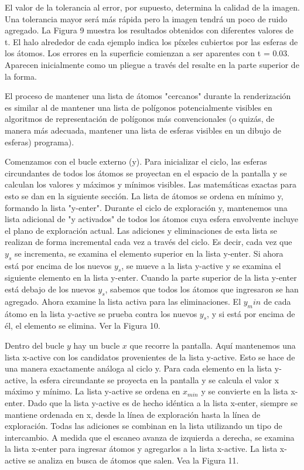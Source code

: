 El valor de la tolerancia al error, por supuesto, determina la calidad de la imagen. Una tolerancia mayor será más rápida pero la imagen tendrá un poco de ruido agregado. La Figura 9 muestra los resultados obtenidos con diferentes valores de t. El halo alrededor de cada ejemplo indica los píxeles cubiertos por las esferas de los átomos. Los errores en la superficie comienzan a ser aparentes con t = 0.03. Aparecen inicialmente como un pliegue a través del resalte en la parte superior de la forma.

El proceso de mantener una lista de átomos "cercanos" durante la renderización es similar al de mantener una lista de polígonos potencialmente visibles en algoritmos de representación de polígonos más convencionales (o quizás, de manera más adecuada, mantener una lista de esferas visibles en un dibujo de esferas) programa).

Comenzamos con el bucle externo (y). Para inicializar el ciclo, las esferas circundantes de todos los átomos se proyectan en el espacio de la pantalla y se calculan los valores y máximos y mínimos visibles. Las matemáticas exactas para esto se dan en la siguiente sección. La lista de átomos se ordena en mínimo y, formando la lista "y-enter". Durante el ciclo de exploración y, mantenemos una lista adicional de "y activados" de todos los átomos cuya esfera envolvente incluye el plano de exploración actual. Las adiciones y eliminaciones de esta lista se realizan de forma incremental cada vez a través del ciclo. Es decir, cada vez que $y_s$ se incrementa, se examina el elemento superior en la lista y-enter. Si ahora está por encima de los nuevos $y_s$, se mueve a la lista y-active y se examina el siguiente elemento en la lista y-enter. Cuando la parte superior de la lista y-enter está debajo de los nuevos $y_s$, sabemos que todos los átomos que ingresaron se han agregado. Ahora examine la lista activa para las eliminaciones. El $y_min$ de cada átomo en la lista y-active se prueba contra los nuevos $y_s$, y si está por encima de él, el elemento se elimina. Ver la Figura 10.

Dentro del bucle $ y $ hay un bucle $ x $ que recorre la pantalla. Aquí mantenemos una lista x-active con los candidatos provenientes de la lista y-active. Esto se hace de una manera exactamente análoga al ciclo y. Para cada elemento en la lista y-active, la esfera circundante se proyecta en la pantalla y se calcula el valor x máximo y mínimo. La lista y-active se ordena en $x_ {min}$ y se convierte en la lista x-enter. Dado que la lista y-active es de hecho idéntica a la lista x-enter, siempre se mantiene ordenada en x, desde la línea de exploración hasta la línea de exploración. Todas las adiciones se combinan en la lista utilizando un tipo de intercambio. A medida que el escaneo avanza de izquierda a derecha, se examina la lista x-enter para ingresar átomos y agregarlos a la lista x-active. La lista x-active se analiza en busca de átomos que salen. Vea la Figura 11.

